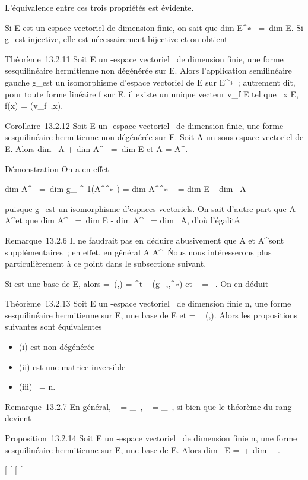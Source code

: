 \documentclass[]{article}
\begin{document}
L'équivalence entre ces trois propriétés est évidente.

Si E est un espace vectoriel de dimension finie, on sait que
dim E^∗~ =\
dim E. Si g_\phi est injective, elle est nécessairement
bijective et on obtient

Théorème~13.2.11 Soit E un -espace vectoriel ~de dimension finie, \phi une
forme sesquilinéaire hermitienne non dégénérée sur E. Alors
l'application semilinéaire gauche g_\phi est un isomorphisme
d'espace vectoriel de E sur E^∗~; autrement dit, pour toute
forme linéaire f sur E, il existe un unique vecteur v_f \in E tel
que \forall~x \in E, f(x) = \phi(v_f~,x).

Corollaire~13.2.12 Soit E un -espace vectoriel ~de dimension finie, \phi
une forme sesquilinéaire hermitienne non dégénérée sur E. Soit A un
sous-espace vectoriel de E. Alors dim~ A
+ dim A^\bot~ =\
dim E et A = A^\bot\bot.

Démonstration On a en effet

dim A^\bot~ =\
dim g_ \phi^-1(A^\bot^∗ )
= dim A^\bot^∗ ~
= dim E -\ dim~ A

puisque g_\phi est un isomorphisme d'espaces vectoriels. On sait
d'autre part que A \subset~ A^\bot\bot et que
dim A^\bot\bot~ =\
dim E - dim A^\bot~
= dim~ A, d'où l'égalité.

Remarque~13.2.6 Il ne faudrait pas en déduire abusivement que A et
A^\bot sont supplémentaires~; en effet, en général A \bigcap
A^\bot\neq~\0\.
Nous nous intéresserons plus particulièrement à ce point dans le
subsectione suivant.

Si  est une base de E, alors \Omega =\
\mathrmMat (\phi,) =
^t \mathrmMat~
(g_\phi,,\mathcal{E}^∗) et
\mathrmrg~\phi
= \mathrmrg~\Omega. On en déduit

Théorème~13.2.13 Soit E un -espace vectoriel ~de dimension finie n, \phi
une forme sesquilinéaire hermitienne sur E,  une base de E et \Omega
= \mathrmMat~ (\phi,). Alors
les propositions suivantes sont équivalentes

\begin{itemize}
\itemsep1pt\parskip0pt\parsep0pt
\item
  (i) \phi est non dégénérée
\item
  (ii) \Omega est une matrice inversible
\item
  (iii) \mathrmrg~\phi = n.
\end{itemize}

Remarque~13.2.7 En général,
\mathrmKer~\phi
= \mathrmKerg_\phi~,
\mathrmrg~\phi
= \mathrmrgg_\phi~, si
bien que le théorème du rang devient

Proposition~13.2.14 Soit E un -espace vectoriel ~de dimension finie n,
\phi une forme sesquilinéaire hermitienne sur E,  une base de E. Alors
dim~ E =\
\mathrmrg\phi + dim~
\mathrmKer~\phi.

[
[
[
[
\end{document}

